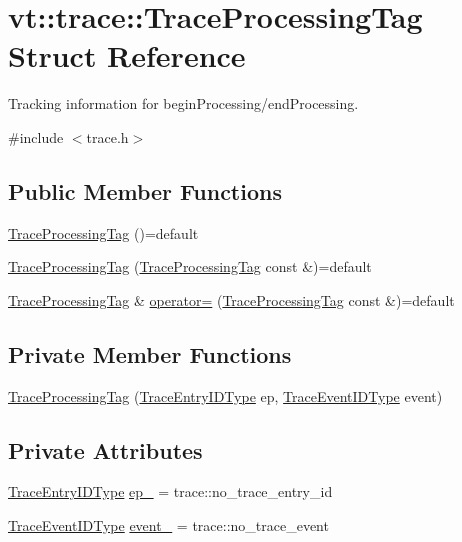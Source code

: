 \hypertarget{structvt_1_1trace_1_1_trace_processing_tag}{}\section{vt\+:\+:trace\+:\+:Trace\+Processing\+Tag Struct Reference}
\label{structvt_1_1trace_1_1_trace_processing_tag}


Tracking information for begin\+Processing/end\+Processing.  




{\ttfamily \#include $<$trace.\+h$>$}

\subsection*{Public Member Functions}
\begin{DoxyCompactItemize}
\item 
\hyperlink{structvt_1_1trace_1_1_trace_processing_tag_af06f6265d03791717242e1cec769dd84}{Trace\+Processing\+Tag} ()=default
\item 
\hyperlink{structvt_1_1trace_1_1_trace_processing_tag_a332019e755f6265ab0a74626322c590f}{Trace\+Processing\+Tag} (\hyperlink{structvt_1_1trace_1_1_trace_processing_tag}{Trace\+Processing\+Tag} const \&)=default
\item 
\hyperlink{structvt_1_1trace_1_1_trace_processing_tag}{Trace\+Processing\+Tag} \& \hyperlink{structvt_1_1trace_1_1_trace_processing_tag_a56727ddff7dce03576f3ed117235b327}{operator=} (\hyperlink{structvt_1_1trace_1_1_trace_processing_tag}{Trace\+Processing\+Tag} const \&)=default
\end{DoxyCompactItemize}
\subsection*{Private Member Functions}
\begin{DoxyCompactItemize}
\item 
\hyperlink{structvt_1_1trace_1_1_trace_processing_tag_af0798e165b92f31ff0b84e7f063162ea}{Trace\+Processing\+Tag} (\hyperlink{namespacevt_1_1trace_a3c14050715ba9eceaeff51fb3de64f2f}{Trace\+Entry\+I\+D\+Type} ep, \hyperlink{namespacevt_1_1trace_a64a7185f3e102df8d8258f263ccd1582}{Trace\+Event\+I\+D\+Type} event)
\end{DoxyCompactItemize}
\subsection*{Private Attributes}
\begin{DoxyCompactItemize}
\item 
\hyperlink{namespacevt_1_1trace_a3c14050715ba9eceaeff51fb3de64f2f}{Trace\+Entry\+I\+D\+Type} \hyperlink{structvt_1_1trace_1_1_trace_processing_tag_a60c4d398c815ba8b140f328ce546a918}{ep\+\_\+} = trace\+::no\+\_\+trace\+\_\+entry\+\_\+id
\item 
\hyperlink{namespacevt_1_1trace_a64a7185f3e102df8d8258f263ccd1582}{Trace\+Event\+I\+D\+Type} \hyperlink{structvt_1_1trace_1_1_trace_processing_tag_ac0ed5366eaeca6f02cb4db7bafdaf732}{event\+\_\+} = trace\+::no\+\_\+trace\+\_\+event
\end{DoxyCompactItemize}
